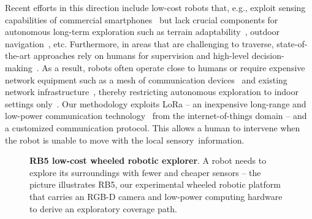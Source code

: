 \documentclass[letterpaper,10pt,conference,twoside]{IEEEtran}
\theoremstyle{definition}
\begin{document}
Recent efforts in this direction include low-cost robots that, e.g., exploit sensing capabilities of commercial smartphones~\cite{muller2021openbot,zhou2021smartphone} but %
lack crucial components for autonomous long-term exploration such as %
terrain adaptability~\cite{muller2021openbot,srinivasa2019mushr}, %
outdoor navigation~\cite{zhou2021smartphone,faisal2021low}, etc. 
%
Furthermore, in areas that are %
challenging to traverse, %
state-of-the-art approaches rely on humans for supervision and high-level decision-making~\cite{tranzatto2022cerberus,roucek2020darpa,tabib2022autonomous}. 
As a result, robots often operate close to humans or require expensive network equipment such as a mesh of communication devices~\cite{kulkarni2022autonomous,ebadi2020lamp} and existing network infrastructure~\cite{khairuldanial2019mobile,%
voigtlander20175g}, thereby restricting autonomous exploration to indoor settings only~\cite{delgado2022oros,
cadena2016past,eldemiry2022autonomous,corah2019communication
}.
%
Our methodology exploits LoRa -- an inexpensive long-range and low-power communication technology~\cite{shanmuga2020survey} from the
internet-of-things domain 
-- and a customized communication protocol. 
This allows a human to intervene when %
the robot %
is unable to move with the local sensory~information. 

\begin{figure}
     
   \caption[RB5 low-cost wheeled robotic explorer]{
     \textbf{RB5 low-cost wheeled robotic explorer}. 
     A robot needs to explore its surroundings with fewer and cheaper sensors -- %
     the picture illustrates RB5, our experimental wheeled robotic platform that carries an RGB-D camera and low-power computing hardware to derive an exploratory coverage path. %
   }
   \vspace*{-.2cm}
   \label{fig:0}
 \end{figure}
\end{document}
